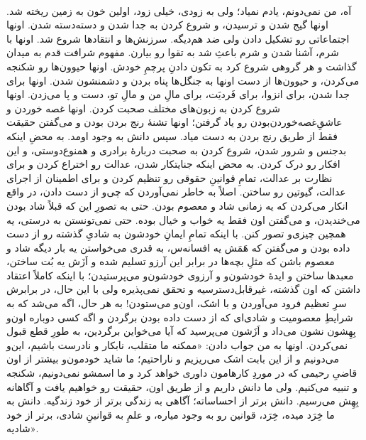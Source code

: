 \documentclass[12pt]{book}
\begin{document}
    \paragraph{}
    آه، من نمی‌دونم، یادم نمیاد؛ ولی به زودی، خیلی زود، اولین خون به زمین ریخته شد. اونها گیج شدن و ترسیدن، و شروع کردن به جدا شدن و دسته‌دسته شدن. اونها اجتماعاتی رو تشکیل دادن ولی ضد هم‌دیگه. سرزنش‌ها و انتقادها شروع شد. اونها با شرم، آشنا شدن و شرم باعثِ شد به تقوا رو بیارن. مفهوم شرافت قدم به میدان گذاشت و هر گروهی شروع کرد به تکون دادنِ پرچمِ خودش. اونها حیوون‌ها رو شکنجه می‌کردن، و حیوون‌ها از دست اونها به جنگل‌ها پناه بردن و دشمنشون شدن. اونها برای جدا شدن، برای انزوا، برای فَردیَت، برای مالِ من و مالِ تو، دست و پا می‌زدن. اونها شروع کردن به زبون‌های مختلف صحبت کردن. اونها غصه خوردن و عاشقِ‌غصه‌خوردن‌بودن رو یاد گرفتن؛ اونها تشنهٔ رنج بردن بودن و می‌گفتن حقیقت فقط از طریق رنج بردن به دست میاد. سپس دانش به وجود اومد. به محضِ اینکه بدجنس و شرور شدن، شروع کردن به صحبت دربارهٔ برادری و همنوع‌دوستی، و این افکار رو درک کردن. به محض اینکه جنایتکار شدن، عدالت رو اختراع کردن و برای نظارت بر عدالت، تمامِ قوانینِ حقوقی رو تنظیم کردن و برای اطمینان از اجرای عدالت، گیوتین رو ساختن. اصلاً به خاطر نمی‌آوردن که چی‌و از دست دادن، در واقع انکار می‌کردن که یه زمانی شاد و معصوم بودن. حتی به تصورِ این که قبلاً شاد بودن می‌خندیدن، و می‌گفتن اون فقط یه خواب و خیال بوده. حتی نمی‌تونستن به درستی، یه همچین چیزی‌و تصور کنن. با اینکه تمامِ ایمانِ خودشون به شادیِ گذشته رو از دست داده بودن و می‌گفتن که هَمَش یه افسانه‌س، به قدری می‌خواستن یه بار دیگه شاد و معصوم باشن که مثلِ بچه‌ها در برابر این آرزو تسلیم شده و اَزَش یه بُت ساختن، معبدها ساختن و ایدهٔ خودشون‌و و آرزوی خودشون‌و می‌پرستیدن؛ با اینکه کاملاً اعتقاد داشتن که اون گذشته، غیرقابل‌دسترسیه و تحقق نمی‌پذیره ولی با این حال، در برابرش سرِ تعظیم فرود می‌آوردن و با اشک، اون‌و می‌ستودن! به هر حال، اگه می‌شد که به شرایطِ معصومیت و شادی‌ای که از دست داده بودن برگردن و اگه کسی دوباره اون‌و بِهِشون نشون می‌داد و اَزَشون می‌پرسید که آیا می‌خواین برگردین، به طورِ قطع قبول نمی‌کردن. اونها به من جواب دادن: «ممکنه ما متقلب، نابکار و نادرست باشیم، این‌و می‌دونیم و از این بابت اشک می‌ریزیم و ناراحتیم؛ ما شاید خودمون‌و بیشتر از اون قاضیِ رحیمی که در موردِ کارهامون داوری خواهد کرد و ما اسمشو نمی‌دونیم، شکنجه و تنبیه می‌کنیم. ولی ما دانش داریم و از طریق اون، حقیقت رو خواهیم یافت و آگاهانه بِهِش می‌رسیم. دانش برتر از احساساته؛ آگاهی به زندگی برتر از خود زندگیه. دانش به ما خِرَد میده، خِرَد، قوانین رو به وجود میاره، و علمِ به قوانینِ شادی، برتر از خود شادیه».
\end{document}
